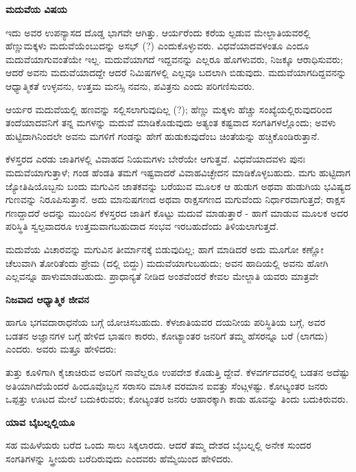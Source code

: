 \begin{center}
\textbf{ಮದುವೆಯ ವಿಷಯ}
\end{center}

ಇದು ಅವರ ಉಪನ್ಯಾಸದ ದೊಡ್ಡ ಭಾಗವೇ ಆಗಿತ್ತು. ಆರ್ಯರೆಂದು ಕರೆಯ ಲ್ಪಡುವ ಮೇಲ್ಜಾತಿಯವರಲ್ಲಿ ಹೆಣ್ಣುಮಕ್ಕಳು ಮದುವೆಯೆಂಬುದನ್ನು ಅಸಭ್ (?) ಎಂದುಕೊಳ್ಳುವರು. ವಿಧವೆಯಾದವಳಂತೂ ಎಂದೂ ಮದುವೆಯಾಗುವಂತೆಯೇ ಇಲ್ಲ. ಮದುವೆಯಾಗದೆ ಇದ್ದವನನ್ನು ಎಲ್ಲರೂ ಹೊಗಳುವರು, ನಿಜಕ್ಕೂ ಆರಾಧಿಸುವರು; ಆದರೆ ಅವನು ಮದುವೆಯಾದದ್ದೇ ಆದರೆ ನಿಮಿಷಗಳಲ್ಲಿ ಎಲ್ಲವೂ ಬದಲಾಗಿ ಬಿಡುವುದು. ಮದುವೆಯಾಗದಿದ್ದವನನ್ನು ಆಧ್ಯಾತ್ಮಿಕತೆ ಉಳ್ಳವನು, ಉತ್ತಮ ಮನಸ್ಸಿ ನವನು, ಪವಿತ್ರನು ಎಂದು ಪರಿಗಣಿಸುವರು.

ಆರ್ಯರ ಮದುವೆಯಲ್ಲಿ ಹಣವನ್ನು ಸಲ್ಲಿಸಲಾಗುವುದಿಲ್ಲ (?); ಹೆಣ್ಣು ಮಕ್ಕಳು ಹೆಚ್ಚು ಸಂಖ್ಯೆಯಲ್ಲಿರುವುದರಿಂದ ತಂದೆಯಾದವನಿಗೆ ತನ್ನ ಮಗಳನ್ನು ಮದುವೆ ಮಾಡಿಕೊಡುವುದು ಅತ್ಯಂತ ಕಷ್ಟವಾದ ಸಂಗತಿಗಳಲ್ಲೊಂದು; ಅವಳು ಹುಟ್ಟಿದಾಗಿನಿಂದಲೇ ಅವನು ಮಗಳಿಗೆ ಗಂಡನ್ನು ಹೇಗೆ ಹುಡುಕುವುದೆಂಬ ಚಿಂತೆಯನ್ನು ಹಚ್ಚಿಕೊಂಡಿರುತ್ತಾನೆ.

ಕೆಳಸ್ತರದ ಎರಡು ಜಾತಿಗಳಲ್ಲಿ ವಿವಾಹದ ನಿಯಮಗಳು ಬೇರೆಯೇ ಆಗುತ್ತವೆ. ವಿಧವೆಯಾದವಳು ಪುನಃ ಮದುವೆಯಾಗುತ್ತಾಳೆ; ಗಂಡ ಹೆಂಡತಿ ತಮಗೆ ಇಷ್ಟವಾದರೆ ವಿವಾಹವಿಚ್ಛೇದನ ಮಾಡಿಕೊಳ್ಳಬಹುದು. ಮಗು ಹುಟ್ಟಿದಾಗ ಜ್ಯೋತಿಷಿಯೊಬ್ಬನು ಬಂದು ಮಗುವಿನ ಜಾತಕವನ್ನು ಬರೆಯುವ ಮೂಲಕ ಆ ಹುಡುಗ ಅಥವಾ ಹುಡುಗಿಯ ಭವಿಷ್ಯದ ಗುಣವನ್ನು ನಿರೂಪಿಸುತ್ತಾನೆ. ಅದು ಮಾನುಷಗಣದ ಅಥವಾ ರಾಕ್ಷಸಗಣದ ಮಗುವೆಂದು ನಿರ್ಧಾರವಾಗುತ್ತದೆ; ರಾಕ್ಷಸ ಗಣದ್ದಾದರೆ ಅದನ್ನು ಮುಂದಿನ ಕೆಳಸ್ತರದ ಜಾತಿಗೆ ಕೊಟ್ಟು ಮದುವೆ ಮಾಡುತ್ತಾರೆ - ಹಾಗೆ ಮಾಡುವ ಮೂಲಕ ಅದರ ಪರಿಸ್ಥಿತಿ ಸ್ವಲ್ಪವಾದರೂ ಉತ್ತಮವಾಗಬಹುದಾದ ಸಂಭವ ಇರಬಹುದೆಂದು ತಿಳಿಯಲಾಗುತ್ತದೆ.

ಮದುವೆಯ ವಿಚಾರವನ್ನು ಮಗುವಿನ ತೀರ್ಮಾನಕ್ಕೆ ಬಿಡುವುದಿಲ್ಲ; ಹಾಗೆ ಮಾಡಿದರೆ ಅದು ಮೂಗೋ ಕಣ್ಣೋ ಚೆಲುವಾಗಿ ತೋರಿತೆಂದು ಪ್ರೇಮ (ದಲ್ಲಿ ಬಿದ್ದು) ಮದುವೆಯಾಗುಬಹುದು; ಅವನ ಹಾದಿಯಲ್ಲಿ ಅವನು ಹೋಗಿ ಎಲ್ಲವನ್ನೂ ಹಾಳುಮಾಡಬಹುದು. ಪ್ರಾಧಾನ್ಯತೆ ನೀಡಿದ ಅಂಶವೆಂದರೆ ಕೇವಲ ಮೇಲ್ಜಾತಿ ಯವರು ಮಾತ್ರವೇ

\begin{center}
\textbf{ನಿಜವಾದ ಆಧ್ಯಾತ್ಮಿಕ ಜೀವನ}
\end{center}

ಹಾಗೂ ಭಗವದಾರಾಧನೆಯ ಬಗ್ಗೆ ಯೋಚಿಸಬಹುದು. ಕೆಳಜಾತಿಯವರ ದಯನೀಯ ಪರಿಸ್ಥಿತಿಯ ಬಗ್ಗೆ, ಅವರ ಬಡತನ ಅಜ್ಞಾನಗಳ ಬಗ್ಗೆ ಹೇಳಿದ ಭಾಷಣ ಕಾರರು, ಕೋಟ್ಯಾಂತರ ಜನರಿಗೆ ತಮ್ಮ ಹೆಸರನ್ನೂ ಬರೆ (ಲಾಗದು) ಎಂದರು. ಅವರು ಮತ್ತೂ ಹೇಳಿದರು:

ತುತ್ತು ಕೂಳಿಗಾಗಿ ಕೈಚಾಚಿರುವ ಅವರಿಗೆ ನಾವೆಲ್ಲರೂ ಉಪದೇಶ ಕೊಡುತ್ತಿ ದ್ದೇವೆ. ಕೆಳವರ್ಗದವರಲ್ಲಿ ಬಡತನ ಅದೆಷ್ಟು ಅತಿಯಾಗಿದೆಯೆಂದರೆ ಹಿಂದೂವೊಬ್ಬನ ಸರಾಸರಿ ಮಾಸಿಕ ವರಮಾನ ಐವತ್ತು ಸೆಂಟ್ಗಳಷ್ಟು. ಕೋಟ್ಯಂತರ ಜನರು ಒಪ್ಪತ್ತು ಊಟದ ಮೇಲೆ ಬದುಕಿರುವರು; ಕೋಟ್ಯಂತರ ಜನರು ಆಹಾರಕ್ಕಾಗಿ ಕಾಡು ಹೂವನ್ನು ತಿಂದು ಬದುಕಿರುವರು.

\begin{center}
\textbf{ಯಾವ ಬೈಬಲ್ನಲ್ಲಿಯೂ}
\end{center}

ಸಹ ಮಹಿಳೆಯರು ಬರೆದ ಒಂದು ಸಾಲು ಸಿಕ್ಕಲಾರದು. ಆದರೆ ತಮ್ಮ ದೇಶದ ಬೈಬಲ್ನಲ್ಲಿ ಅನೇಕ ಸುಂದರ ಸಂಗತಿಗಳನ್ನು ಸ್ತ್ರೀಯರು ಬರೆದಿರುವುದು ಎಂದವರು ಹೆಮ್ಮೆಯಿಂದ ಹೇಳಿದರು.


